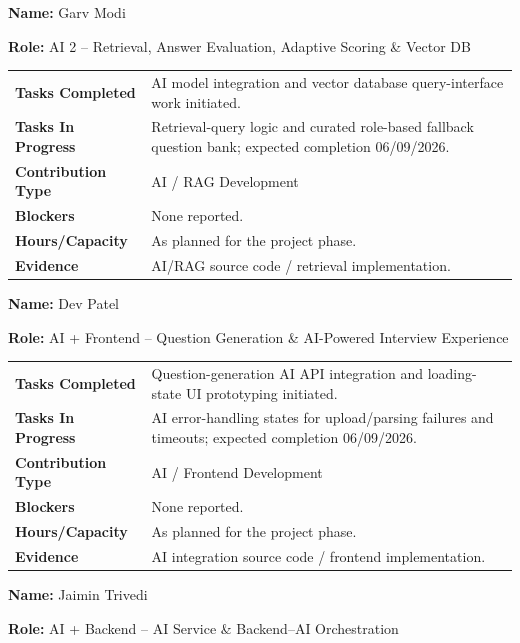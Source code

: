 \documentclass[11pt,a4paper]{article}
\newcommand{\field}[2]{\textbf{#1:} #2\par}
\begin{document}
\vspace{10pt}
\field{Name}{Garv Modi}
\field{Role}{AI 2 -- Retrieval, Answer Evaluation, Adaptive Scoring \& Vector DB}

\vspace{4pt}
\begin{tabular}{>{\bfseries}p{} p{}}
\toprule
Tasks Completed & AI model integration and vector database query-interface work initiated. \\
Tasks In Progress & Retrieval-query logic and curated role-based fallback question bank; expected completion 06/09/2026. \\
Contribution Type & AI / RAG Development \\
Blockers & None reported. \\
Hours/Capacity & As planned for the project phase. \\
Evidence & AI/RAG source code / retrieval implementation. \\
\bottomrule
\end{tabular}

\vspace{10pt}
\field{Name}{Dev Patel}
\field{Role}{AI + Frontend -- Question Generation \& AI-Powered Interview Experience}

\vspace{4pt}
\begin{tabular}{>{\bfseries}p{} p{}}
\toprule
Tasks Completed & Question-generation AI API integration and loading-state UI prototyping initiated. \\
Tasks In Progress & AI error-handling states for upload/parsing failures and timeouts; expected completion 06/09/2026. \\
Contribution Type & AI / Frontend Development \\
Blockers & None reported. \\
Hours/Capacity & As planned for the project phase. \\
Evidence & AI integration source code / frontend implementation. \\
\bottomrule
\end{tabular}

\vspace{10pt}
\field{Name}{Jaimin Trivedi}
\field{Role}{AI + Backend -- AI Service \& Backend--AI Orchestration}
\end{document}
